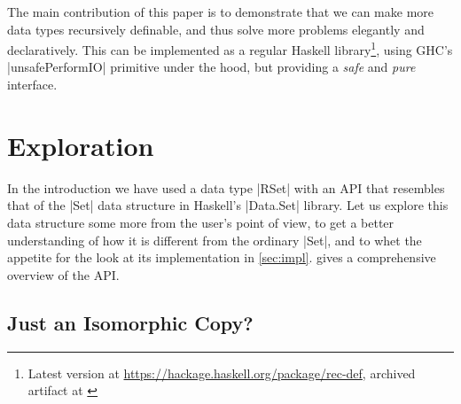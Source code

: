 \documentclass[manuscript,screen,acmsmall,nonacm]{acmart}
\begin{document}

The main contribution of this paper is to demonstrate that we can make more data types recursively definable, and thus solve more problems elegantly and declaratively.
This can be implemented as a regular Haskell library\footnote{Latest version at \url{https://hackage.haskell.org/package/rec-def}, archived artifact at \citep{aec}}, using GHC's |unsafePerformIO| primitive under the hood, but providing a \emph{safe} and \emph{pure} interface.

\iffalse
The main contributions of this paper are:

\begin{itemize}
\item We demonstrate that by making more data types recursively definable, more problems can be solved elegantly and declaratively. They are \emph{safe}, \emph{pure} and are a natural fit for a language like Haskell.

\item We show how to implement this as a regular library, using GHC's |unsafePerformIO| primitive under the hood.

\item We discuss the difficulties of answering the question whether a language extension like this can still be considered \emph{pure}, contributing questions rather than conclusive answers.

\end{itemize}
\fi

\section{Exploration}\label{sec:exploration}

In the introduction we have used a data type |RSet| with an API that resembles that of the |Set| data structure in Haskell's |Data.Set| library. Let us explore this data structure some more from the user's point of view, to get a better understanding of how it is different from the ordinary |Set|, and to whet the appetite for the look at its implementation in \cref{sec:impl}.
 gives a comprehensive overview of the API.

\subsection{Just an Isomorphic Copy?}
\end{document}

